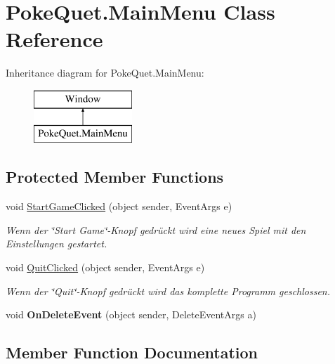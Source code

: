 \hypertarget{class_poke_quet_1_1_main_menu}{}\section{Poke\+Quet.\+Main\+Menu Class Reference}
\label{class_poke_quet_1_1_main_menu}
Inheritance diagram for Poke\+Quet.\+Main\+Menu\+:\begin{figure}[H]
\begin{center}
\leavevmode
\includegraphics[height=2.000000cm]{class_poke_quet_1_1_main_menu}
\end{center}
\end{figure}
\subsection*{Protected Member Functions}
\begin{DoxyCompactItemize}
\item 
void \mbox{\hyperlink{class_poke_quet_1_1_main_menu_a66d3fc7a5c2b1b41fef3c3a1ee268c01}{Start\+Game\+Clicked}} (object sender, Event\+Args e)
\begin{DoxyCompactList}\small\item\em Wenn der \char`\"{}\+Start Game\char`\"{}-\/\+Knopf gedrückt wird eine neues Spiel mit den Einstellungen gestartet. \end{DoxyCompactList}\item 
void \mbox{\hyperlink{class_poke_quet_1_1_main_menu_a7838f72cbda854dda35ba2d309213646}{Quit\+Clicked}} (object sender, Event\+Args e)
\begin{DoxyCompactList}\small\item\em Wenn der \char`\"{}\+Quit\char`\"{}-\/\+Knopf gedrückt wird das komplette Programm geschlossen. \end{DoxyCompactList}\item 
\mbox{\label{class_poke_quet_1_1_main_menu_ace589725732f2aeff8397f6a66741016}} 
void {\bfseries On\+Delete\+Event} (object sender, Delete\+Event\+Args a)
\end{DoxyCompactItemize}


\subsection{Member Function Documentation}
\mbox{\label{class_poke_quet_1_1_main_menu_a7838f72cbda854dda35ba2d309213646}} 
